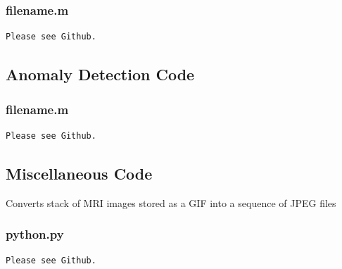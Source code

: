 \documentclass[12pt]{article}
\theoremstyle{plain}%
\theoremstyle{definition}
\theoremstyle{remark}
\begin{document}
\subsubsection{filename.m}
\begin{verbatim}
Please see Github.
\end{verbatim}

\subsection{Anomaly Detection Code}
\subsubsection{filename.m}
\begin{verbatim}
Please see Github.
\end{verbatim}

\subsection{Miscellaneous Code}
Converts stack of MRI images stored as a GIF into a sequence of JPEG files
\subsubsection{python.py}
\begin{verbatim}
Please see Github.
\end{verbatim}
\end{document}

